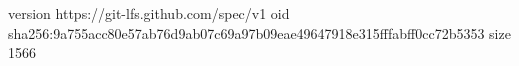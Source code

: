 version https://git-lfs.github.com/spec/v1
oid sha256:9a755acc80e57ab76d9ab07c69a97b09eae49647918e315fffabff0cc72b5353
size 1566
